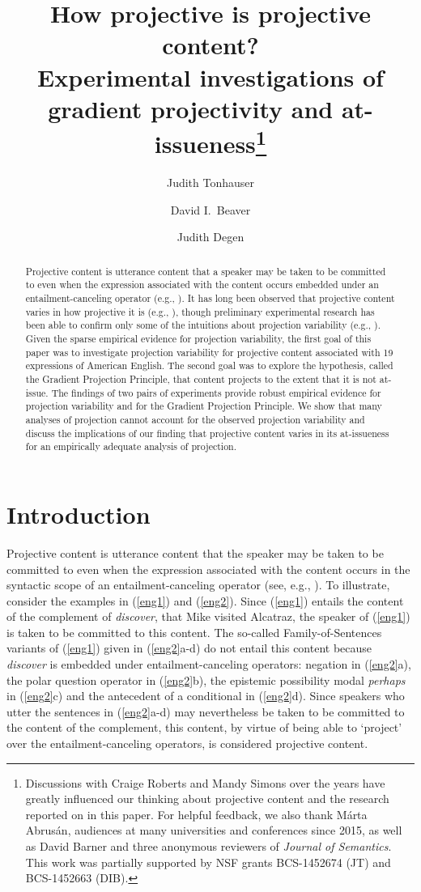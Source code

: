 \documentclass[11pt,fleqn]{article}
\title{How projective is projective content? \\ Experimental investigations of gradient projectivity and at-issueness\thanks{Discussions with Craige Roberts and Mandy Simons over the years have greatly influenced our thinking about projective content and the research reported on in this paper. For helpful feedback, we also thank M\'arta Abrus\'an, audiences at many universities and conferences since 2015, as well as David Barner and three anonymous reviewers of {\em Journal of Semantics}. This work was partially supported by NSF grants BCS-1452674 (JT) and BCS-1452663 (DIB).}}
\author[$\bullet$]{Judith Tonhauser}
\author[$\circ$]{David I.\ Beaver}
\author[$\triangleright$]{Judith Degen}
\affil[$\bullet$]{The Ohio State University}
\affil[$\circ$]{University of Texas at Austin}
\affil[$\triangleright$]{Stanford University}
\newcommand{\6}{\mbox{$[\hspace*{-.6mm}[$}}
\newcommand{\9}{\mbox{$]\hspace*{-.6mm}]$}}
\begin{document}
\maketitle

\begin{abstract}
Projective content is utterance content that a speaker may be taken to be committed to even when the expression associated with the content occurs embedded under an entailment-canceling operator (e.g., \citealt{ccmg90}). It has long been observed that projective content varies in how projective it is (e.g., \citealt{karttunen71b,simons01,abusch10}), though preliminary experimental research has been able to confirm only some of the intuitions about projection variability (e.g., \citealt{smith-hall11,xue-onea11}). Given the sparse empirical evidence for projection variability, the first goal of this paper was to investigate projection variability for projective content associated with 19 expressions of American English. The second goal was to explore the hypothesis, called the Gradient Projection Principle, that content projects to the extent that it is not at-issue. The findings of two pairs of experiments provide robust empirical evidence for projection variability and for the Gradient Projection Principle. We show that many analyses of projection  cannot account for the observed projection variability and discuss the implications of our finding that projective content varies in its at-issueness for an empirically adequate analysis of projection.

\end{abstract}


			
\section{Introduction}\label{s1}

Projective content is utterance content that the speaker may be taken to be committed to even when the expression associated with the content occurs in the syntactic scope of an entailment-canceling operator (see, e.g., \citealt{ccmg90}). To illustrate, consider the examples in (\ref{eng1}) and (\ref{eng2}). Since (\ref{eng1}) entails the content of the complement of {\em discover}, that Mike visited Alcatraz, the speaker of (\ref{eng1}) is taken to be committed to this content. The so-called Family-of-Sentences variants of (\ref{eng1}) given in (\ref{eng2}a-d) do not entail this content because {\em discover} is embedded under entailment-canceling operators: negation in (\ref{eng2}a), the polar question operator in (\ref{eng2}b), the epistemic possibility modal {\em perhaps} in (\ref{eng2}c) and the antecedent of a conditional in (\ref{eng2}d). Since speakers who utter the sentences in (\ref{eng2}a-d) may nevertheless be taken to be committed to the content of the complement, this content, by virtue of being able to `project' over the entailment-canceling operators, is considered projective content. 
\end{document}
